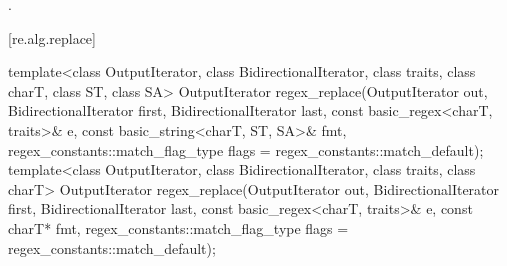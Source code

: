 \begin{itemdescr}
\pnum
\returns
{}.
\end{itemdescr}

[re.alg.replace]{}

%
\begin{itemdecl}
template<class OutputIterator, class BidirectionalIterator,
         class traits, class charT, class ST, class SA>
  OutputIterator
    regex_replace(OutputIterator out,
                  BidirectionalIterator first, BidirectionalIterator last,
                  const basic_regex<charT, traits>& e,
                  const basic_string<charT, ST, SA>& fmt,
                  regex_constants::match_flag_type flags = regex_constants::match_default);
template<class OutputIterator, class BidirectionalIterator, class traits, class charT>
  OutputIterator
    regex_replace(OutputIterator out,
                  BidirectionalIterator first, BidirectionalIterator last,
                  const basic_regex<charT, traits>& e,
                  const charT* fmt,
                  regex_constants::match_flag_type flags = regex_constants::match_default);
\end{itemdecl}

